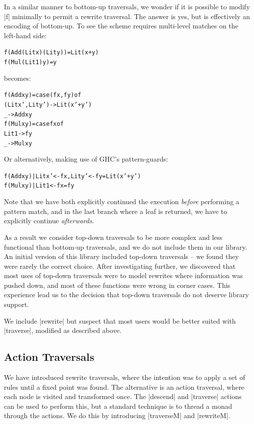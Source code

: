 \documentclass[preprint]{sigplanconf}
\newenvironment{code}{\begin{alltt}\small}{\end{alltt}}
\begin{document}
In a similar manner to bottom-up traversals, we wonder if it is possible to modify |f| minimally to permit a rewrite traversal. The answer is yes, but is effectively an encoding of bottom-up. To see the scheme requires multi-level matches on the left-hand side:

\begin{code}
f (Add (Lit x) (Lit y)  ) = Lit (x+y)
f (Mul (Lit 1) y        ) = y
\end{code}

\noindent becomes:

\begin{code}
f (Add x y) = case  (f x     , f y     ) of
                    (Lit x'  , Lit y'  ) -> Lit (x'+y')
                    _ -> Add x y
f (Mul x y) = case  f x of
                    Lit 1 -> f y
                    _ -> Mul x y
\end{code}

\noindent Or alternatively, making use of GHC's pattern-guards:

\begin{code}
f (Add  x y) | Lit x'  <- f x, Lit y' <- f y = Lit (x'+y')
f (Mul  x y) | Lit 1   <- f x = f y
\end{code}

Note that we have both explicitly continued the execution \textit{before} performing a pattern match, and in the last branch where a leaf is returned, we have to explicitly continue \textit{afterwards}.

As a result we consider top-down traversals to be more complex and less functional than bottom-up traversals, and we do not include them in our library. An initial version of this library included top-down traversals -- we found they were rarely the correct choice. After investigating further, we discovered that most uses of top-down traversals were to model rewrites where information was pushed down, and most of these functions were wrong in corner cases. This experience lead us to the decision that top-down traversals do not deserve library support.

We include |rewrite| but suspect that most users would be better suited with |traverse|, modified as described above.

\subsection{Action Traversals}

We have introduced rewrite traversals, where the intention was to apply a set of rules until a fixed point was found. The alternative is an action traversal, where each node is visited and transformed once. The |descend| and |traverse| actions can be used to perform this, but a standard technique is to thread a monad through the actions. We do this by introducing |traverseM| and |rewriteM|.
\end{document}
